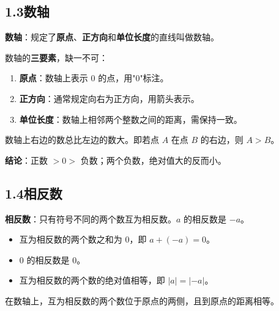 \documentclass[12pt, a4paper]{ctexart}
\begin{document}
\subsection*{1.3\quad 数轴}

\begin{knowledgebox}[数轴的定义与三要素]
\textbf{数轴}：规定了\textbf{原点}、\textbf{正方向}和\textbf{单位长度}的直线叫做数轴。

数轴的\textbf{三要素}，缺一不可：
\begin{enumerate}[leftmargin=*]
  \item \textbf{原点}：数轴上表示 $0$ 的点，用"$0$"标注。
  \item \textbf{正方向}：通常规定向右为正方向，用箭头表示。
  \item \textbf{单位长度}：数轴上相邻两个整数之间的距离，需保持一致。
\end{enumerate}

\begin{center}
\end{center}
\end{knowledgebox}

\begin{tipbox}[数轴上的大小关系]
数轴上右边的数总比左边的数大。即若点 $A$ 在点 $B$ 的右边，则 $A > B$。

\textbf{结论}：正数 $> 0 >$ 负数；两个负数，绝对值大的反而小。
\end{tipbox}

\subsection*{1.4\quad 相反数}

\begin{knowledgebox}[相反数的定义]
\textbf{相反数}：只有符号不同的两个数互为相反数。$a$ 的相反数是 $-a$。

\begin{itemize}[leftmargin=*]
  \item 互为相反数的两个数之和为 $0$，即 $a + (-a) = 0$。
  \item $0$ 的相反数是 $0$。
  \item 互为相反数的两个数的绝对值相等，即 $|a| = |-a|$。
\end{itemize}

在数轴上，互为相反数的两个数位于原点的两侧，且到原点的距离相等。
\end{knowledgebox}
\end{document}
